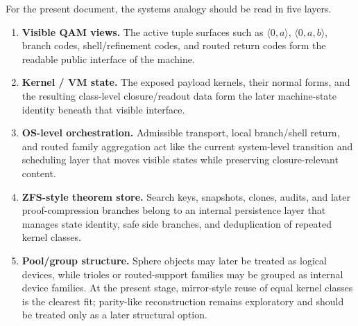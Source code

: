 \begin{remark}\label{rem:qam-vm-os-reading}
For the present document, the systems analogy should be read in five layers.
\begin{enumerate}[leftmargin=2em]
  \item \textbf{Visible QAM views.} The active tuple surfaces such as $\langle 0,a\rangle$, $\langle 0,a,b\rangle$, branch codes, shell/refinement codes, and routed return codes form the readable public interface of the machine.
  \item \textbf{Kernel / VM state.} The exposed payload kernels, their normal forms, and the resulting class-level closure/readout data form the later machine-state identity beneath that visible interface.
  \item \textbf{OS-level orchestration.} Admissible transport, local branch/shell return, and routed family aggregation act like the current system-level transition and scheduling layer that moves visible states while preserving closure-relevant content.
  \item \textbf{ZFS-style theorem store.} Search keys, snapshots, clones, audits, and later proof-compression branches belong to an internal persistence layer that manages state identity, safe side branches, and deduplication of repeated kernel classes.
  \item \textbf{Pool/group structure.} Sphere objects may later be treated as logical devices, while trioles or routed-support families may be grouped as internal device families. At the present stage, mirror-style reuse of equal kernel classes is the clearest fit; parity-like reconstruction remains exploratory and should be treated only as a later structural option.
\end{enumerate}
\end{remark}

